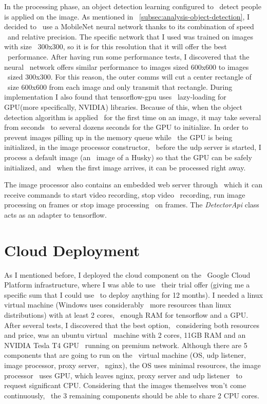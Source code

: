 In the processing phase, an object detection learning configured to \
detect people is applied on the image.
As mentioned in ~\ref{subsec:analysis-object-detection}, I decided to \
use a MobileNet neural network thanks to its combination of speed \
and relative precision.
The specific network that I used was trained on images with size \
300x300, so it is for this resolution that it will offer the best \
performance.
After having run some performance tests, I discovered that the neural \
network offers similar performance to images sized 600x600 to images \
sized 300x300.
For this reason, the outer comms will cut a center rectangle of \
size 600x600 from each image and only transmit that rectangle. %
During implementation I also found that tensorflow-gpu uses \
lazy-loading for GPU(more specifically, NVIDIA) libraries.
Because of this, when the object detection algorithm is applied \
for the first time on an image, it may take several from seconds \
to several dozens seconds for the GPU to initialize.
In order to prevent images pilling up in the memory queue while \
the GPU is being initialized, in the image processor constructor, \
before the udp server is started, I process a default image (an \
image of a Husky) so that the GPU can be safely initialized, and \
when the first image arrives, it can be processed right away.

 The image processor also contains an embedded web server through \
which it can receive commands to start video recording, stop video \
recording, run image processing on frames or stop image processing \
on frames.
The \textit{DetectorApi} class acts as an adapter to tensorflow.

\section{Cloud Deployment}
\label{sec:implementation-cloud-deployment}
As I mentioned before, I deployed the cloud component on the \
Google Cloud Platform infrastructure, where I was able to use \
their trial offer (giving me a specific sum that I could use \
to deploy anything for 12 months).
I needed a linux virtual machine (Windows uses considerably \
more resources than linux distributions) with at least 2 cores, \
enough RAM for tensorflow and a GPU.
After several tests, I discovered that the best option, \
considering both resources and price, was an ubuntu virtual \
machine with 2 cores, 11GB RAM and an NVIDIA Tesla T4 GPU \
running on premium network.
Although there are 5 components that are going to run on the \
virtual machine (OS, udp listener, image processor, proxy server, \
nginx), the OS uses minimal resources, the image processor \
uses GPU, which leaves nginx, proxy server and udp listener \
to request significant CPU.
Considering that the images themselves won't come continuously, \
the 3 remaining components should be able to share 2 CPU cores.

